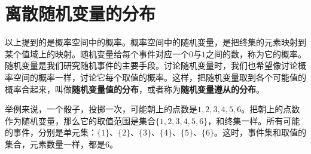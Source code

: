 \documentclass[12pt,UTF8]{ctexbook}
\begin{document}
\section{离散随机变量的分布}

以上提到的是概率空间中的概率。概率空间中的随机变量，是把终集的元素映射到某个值域上的映射。随机变量给每个事件对应一个$0$与$1$之间的数，称为它的概率。随机变量是我们研究随机事件的主要手段。讨论随机变量时，我们也希望像讨论概率空间的概率一样，讨论它每个取值的概率。这样，把随机变量取到各个可能值的概率合起来，叫做\textbf{随机变量值的分布}，或者称为\textbf{随机变量遵从的分布}。

举例来说，一个骰子，投掷一次，可能朝上的点数是$1,2,3,4,5,6$。把朝上的点数作为随机变量，那么它的取值范围是集合$\{1,2,3,4,5,6\}$，和终集一样。所有可能的事件，分别是单元集：$\{1\}$、$\{2\}$、$\{3\}$、$\{4\}$、$\{5\}$、$\{6\}$。这时，事件集和取值的集合，元素数量一样，都是$6$。
\end{document}
